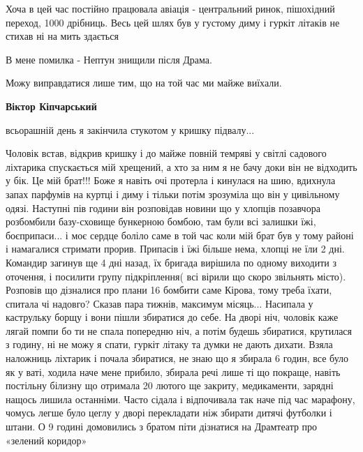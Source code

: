 \begin{itemize}

Хоча в цей час постійно працювала авіація - центральний ринок, пішохідний
переход, 1000 дрібниць. Весь цей шлях був у густому диму і гуркіт літаків не
стихав ні на мить здається


В мене помилка - Нептун знищили після Драма.

Можу виправдатися лише тим, що на той час ми майже виїхали.

\textbf{Віктор Кіпчарський} 

всьорашній день я закінчила стукотом у кришку підвалу...

Чоловік встав, відкрив кришку і до майже повній темряві у світлі садового
ліхтарика спускається мій хрещений, а хто за ним я не бачу доки він не
відходить у бік. Це мій брат!!! Боже я навіть очі протерла і кинулася на шию,
вдихнула запах парфумів на куртці і диму і тільки потім зрозуміла що він у
цивільному одязі. Наступні пів години він розповідав новини що у хлопців
позавчора розбомбили базу-сховище бункерною бомбою, там були всі залишки їжі,
боєприпаси... і моє сердце боліло саме в той час коли мій брат був у тому районі
і намагалися стримати прорив. Припасів і їжі більше нема, хлопці не їли 2 дні.
Командир загинув ще 4 дні назад, їх бригада вирішила по одному виходити з
оточення, і посилити групу підкріплення( всі вірили що скоро звільнять місто).
Розповів що дізналися про плани 16 бомбити саме Кірова, тому треба їхати,
спитала чі надовго? Сказав пара тижнів, максимум місяць... Насипала у каструльку
борщу і вони пішли збиратися до себе. На дворі ніч, чоловік каже лягай помпи бо
ти не спала попередню ніч, а потім будешь збиратися, крутилася з годину, ні не
можу я спати, гуркіт літаку та думки не дають дихати. Взяла наложниць ліхтарик
і почала збиратися, не знаю що я збирала 6 годин, все було як у ваті, ходила
наче мене прибило, збирала речі лише ті що покраще, навіть постільну білизну що
отримала 20 лютого ще закриту, медикаменти, зарядні нащось лишила останніми.
Часто сідала і відпочивала так наче під час марафону, чомусь легше було цеглу у
дворі перекладати ніж збирати дитячі футболки і штани. О 9 годині домовились з
братом піти дізнатися на Драмтеатр про «зелений коридор»



\end{itemize}
